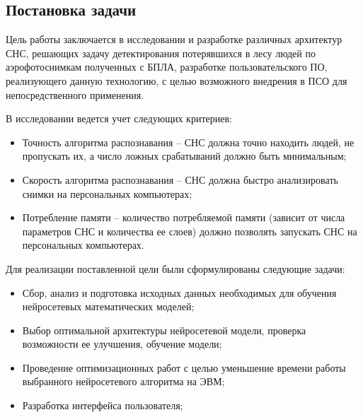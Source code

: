 \subsection{Постановка задачи}

Цель работы заключается в исследовании и разработке различных архитектур СНС, решающих задачу детектирования потерявшихся в лесу людей по аэрофотоснимкам полученных с БПЛА, разработке пользовательского ПО, реализующего данную технологию, с целью возможного внедрения в ПСО для непосредственного применения.

В исследовании ведется учет следующих критериев:
\begin{itemize}
    \item Точность алгоритма распознавания -- СНС должна точно находить людей, не пропускать их, а число ложных срабатываний должно быть минимальным;
    \item Скорость алгоритма распознавания -- СНС должна быстро анализировать снимки на персональных компьютерах;
    \item Потребление памяти -- количество потребляемой памяти (зависит от числа параметров СНС и количества ее слоев) должно позволять запускать СНС на персональных компьютерах.
\end{itemize}

Для реализации поставленной цели были сформулированы следующие задачи:
\begin{itemize}
    \item Сбор, анализ и подготовка исходных данных необходимых для обучения нейросетевых математических моделей;
    \item Выбор оптимальной архитектуры нейросетевой модели, проверка возможности ее улучшения, обучение модели;
    \item Проведение оптимизационных работ с целью уменьшение времени работы выбранного нейросетевого алгоритма на ЭВМ;
    \item Разработка интерфейса пользователя;
\end{itemize}
